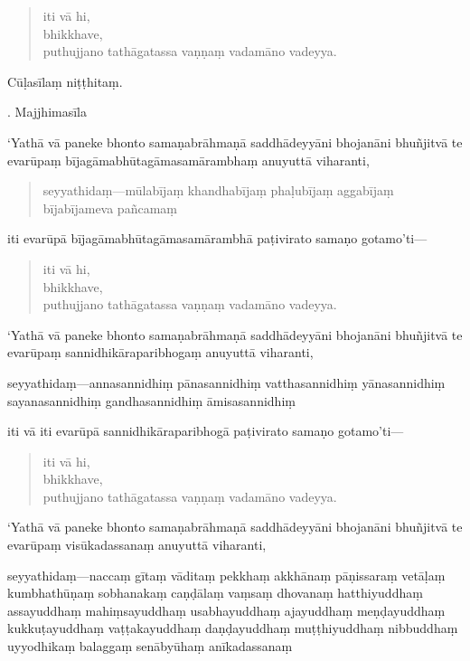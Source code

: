 \documentclass[11pt,twoside,openright]{book}
\begin{document}
\begin{verse}
iti vā hi,\\
\vin  bhikkhave,\\
\vin  puthujjano tathāgatassa vaṇṇaṃ vadamāno vadeyya.

\end{verse}
\pstart
Cūḷasīlaṃ niṭṭhitaṃ.
\pend

. Majjhimasīla
\pend

\pstart
‘Yathā vā paneke bhonto samaṇabrāhmaṇā saddhādeyyāni bhojanāni bhuñjitvā te evarūpaṃ bījagāmabhūtagāmasamārambhaṃ anuyuttā viharanti,
\pend

\begin{verse}
seyyathidaṃ—mūlabījaṃ khandhabījaṃ phaḷubījaṃ aggabījaṃ bījabījameva pañcamaṃ\\


\end{verse}
\pstart
iti evarūpā bījagāmabhūtagāmasamārambhā paṭivirato samaṇo gotamo’ti—
\pend

\begin{verse}
iti vā hi,\\
\vin  bhikkhave,\\
\vin  puthujjano tathāgatassa vaṇṇaṃ vadamāno vadeyya.

\end{verse}
\pstart
‘Yathā vā paneke bhonto samaṇabrāhmaṇā saddhādeyyāni bhojanāni bhuñjitvā te evarūpaṃ sannidhikāraparibhogaṃ anuyuttā viharanti,
\pend

\pstart
seyyathidaṃ—annasannidhiṃ pānasannidhiṃ vatthasannidhiṃ yānasannidhiṃ sayanasannidhiṃ gandhasannidhiṃ āmisasannidhiṃ
\pend

\pstart
iti vā iti evarūpā sannidhikāraparibhogā paṭivirato samaṇo gotamo’ti—
\pend

\begin{verse}
iti vā hi,\\
\vin  bhikkhave,\\
\vin  puthujjano tathāgatassa vaṇṇaṃ vadamāno vadeyya.

\end{verse}
\pstart
‘Yathā vā paneke bhonto samaṇabrāhmaṇā saddhādeyyāni bhojanāni bhuñjitvā te evarūpaṃ visūkadassanaṃ anuyuttā viharanti,
\pend

\pstart
seyyathidaṃ—naccaṃ gītaṃ vāditaṃ pekkhaṃ akkhānaṃ pāṇissaraṃ vetāḷaṃ kumbhathūṇaṃ sobhanakaṃ caṇḍālaṃ vaṃsaṃ dhovanaṃ hatthiyuddhaṃ assayuddhaṃ mahiṃsayuddhaṃ usabhayuddhaṃ ajayuddhaṃ meṇḍayuddhaṃ kukkuṭayuddhaṃ vaṭṭakayuddhaṃ daṇḍayuddhaṃ muṭṭhiyuddhaṃ nibbuddhaṃ uyyodhikaṃ balaggaṃ senābyūhaṃ anīkadassanaṃ
\pend
\end{document}
